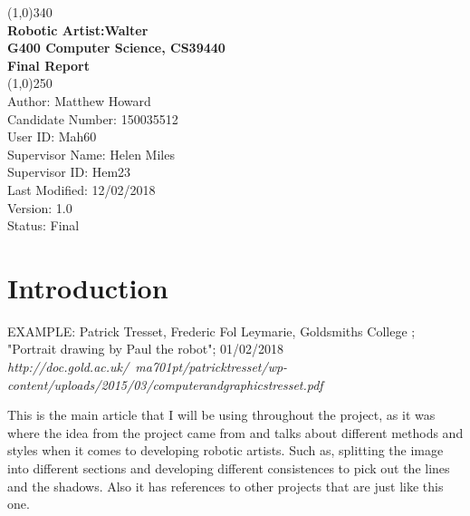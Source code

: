 \documentclass{article}
\begin{document}

    \begin{titlepage}

        \begin{center}

        \line(1,0){340}\\ 


        \large{\bfseries Robotic Artist:Walter} \\

        \large {\bfseries G400 Computer Science, CS39440 }\\
        
        \large {\bfseries Final Report}\\


         \line(1,0){250}\\

         \textsf {Author: Matthew Howard \\
          Candidate Number: 150035512\\
          User ID: Mah60 \\
          Supervisor Name: Helen Miles \\
          Supervisor ID: Hem23\\
          Last Modified: 12/02/2018 \\
          Version: 1.0\\
          Status: Final} \\

        \end{center}        

    \end{titlepage}
  
    \clearpage

 	\tableofcontents
 	
 	\clearpage

    \section{Introduction}


    \begin{thebibliography}{9}


    EXAMPLE: Patrick Tresset, Frederic Fol Leymarie, Goldsmiths College ; "Portrait drawing by Paul the robot"; 01/02/2018 \\ 

    \textit{http://doc.gold.ac.uk/~ma701pt/patricktresset/wp-content/uploads/2015/03/computerandgraphicstresset.pdf}

    

This is the main article that I will be using throughout the project, as it was where the idea from the project came from and talks about different methods and styles when it comes to developing robotic artists. Such as, splitting the image into different sections and developing different consistences to pick out the lines and the shadows. Also it has references to other projects that are just like this one. 
    

    \end{thebibliography}
\end{document}
